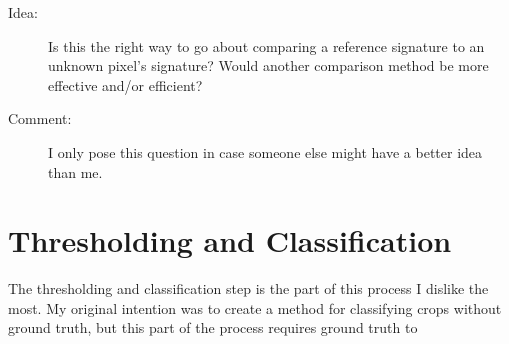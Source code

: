 \begin{description}
\item[Idea:] Is this the right way to go about comparing a reference signature to an unknown pixel’s signature? Would another comparison method be more effective and/or efficient?

\item[Comment:] I only pose this question in case someone else might have a better idea than me. 
\end{description}

\section{Thresholding and Classification}

The thresholding and classification step is the part of this process I dislike the most. My original intention was to create a method for classifying crops without ground truth, but this part of the process requires ground truth to 

